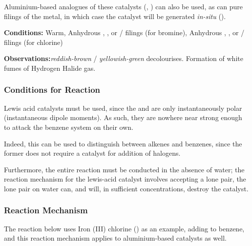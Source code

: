 		Aluminium-based analogues of these catalysts (, ) can also be used, as can pure
		filings of the metal, in which case the catalyst will be generated \textit{in-situ} ().


		\vspace{1.5em}
		\vbox{\textbf{Conditions:}	\tabto{35mm}Warm, Anhydrous , , or  / \ch{\aluminium} filings (for bromine),
									\tabto{35mm}Anhydrous , , or
												 / \ch{\aluminium} filings (for chlorine)}\vspace{0.5em}

		\vbox{\textbf{Observations:}\tabto{35mm}\textit{\color{Mahogany}reddish-brown}  / \textit{\color{YellowGreen}yellowish-green}  decolourises.
									\tabto{35mm}Formation of white fumes of Hydrogen Halide gas.}


		\subsubsection{Conditions for Reaction}

			Lewis acid catalysts must be used, since the  and \ch{\chlorine-\chlorine} are only instantaneously polar (instantaneous
			dipole moments). As such, they are nowhere near strong enough to attack the benzene system on their own.

			Indeed, this can be used to distinguish between alkenes and benzenes, since the former does not require a catalyst for addition
			of halogens.

			Furthermore, the entire reaction must be conducted in the absence of water; the reaction mechanism for the lewis-acid catalyst
			involves accepting a lone pair, the lone pair on water can, and will, in sufficient concentrations, destroy the catalyst.




		\subsubsection{Reaction Mechanism}

			\vspace{2.0em}

			The reaction below uses Iron (III) chlorine () as an example, adding \ch{\chlorine} to benzene, and this reaction
			mechanism applies to aluminium-based catalysts as well.

